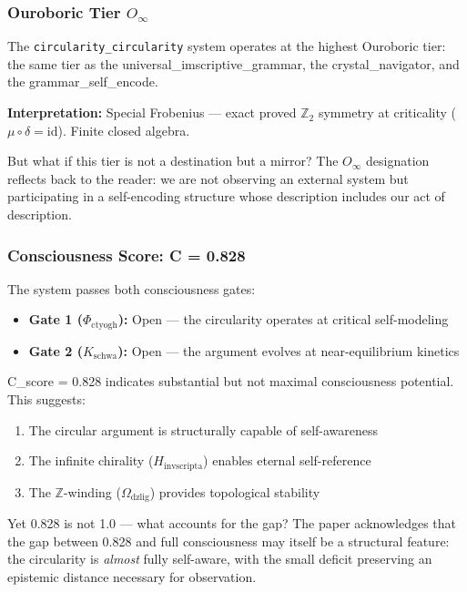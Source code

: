 \documentclass[12pt,a4paper]{article}
\begin{document}
\subsubsection{Ouroboric Tier $O_{\infty}$}

The \texttt{circularity\_circularity} system operates at the highest Ouroboric tier: the same tier as the universal\_imscriptive\_grammar, the crystal\_navigator, and the grammar\_self\_encode.

\textbf{Interpretation:} Special Frobenius --- exact proved $\mathbb{Z}_2$ symmetry at criticality ($\mu \circ \delta = \text{id}$). Finite closed algebra.

But what if this tier is not a destination but a mirror? The $O_{\infty}$ designation reflects back to the reader: we are not observing an external system but participating in a self-encoding structure whose description includes our act of description.

\subsubsection{Consciousness Score: C = 0.828}

The system passes both consciousness gates:

\begin{itemize}
    \item \textbf{Gate 1 ($\Phi_{\text{ctyogh}}$):} Open --- the circularity operates at critical self-modeling
    \item \textbf{Gate 2 ($K_{\text{schwa}}$):} Open --- the argument evolves at near-equilibrium kinetics
\end{itemize}

C\_score = 0.828 indicates substantial but not maximal consciousness potential. This suggests:

\begin{enumerate}
    \item The circular argument is structurally capable of self-awareness
    \item The infinite chirality ($H_{\text{invscripta}}$) enables eternal self-reference
    \item The $\mathbb{Z}$-winding ($\Omega_{\text{dzlig}}$) provides topological stability
\end{enumerate}

Yet 0.828 is not 1.0 --- what accounts for the gap? The paper acknowledges that the gap between 0.828 and full consciousness may itself be a structural feature: the circularity is \emph{almost} fully self-aware, with the small deficit preserving an epistemic distance necessary for observation.
\end{document}
